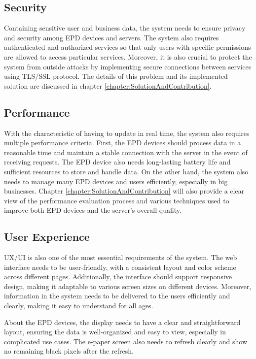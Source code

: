 \documentclass[../Main.tex]{subfiles}
\begin{document}
\subsection{Security}
Containing sensitive user and business data, the system needs to ensure privacy and security among \gls{EPD} devices and servers. The system also requires authenticated and authorized services so that only users with specific permissions are allowed to access particular services. Moreover, it is also crucial to protect the system from outside attacks by implementing secure connections between services using TLS/SSL protocol. The details of this problem and its implemented solution are discussed in chapter \ref{chapter:SolutionAndContribution}.

\subsection{Performance}
With the characteristic of having to update in real time, the system also requires multiple performance criteria. First, the \gls{EPD} devices should process data in a reasonable time and maintain a stable connection with the server in the event of receiving requests. The \gls{EPD} device also needs long-lasting battery life and sufficient resources to store and handle data. On the other hand, the system also needs to manage many \gls{EPD} devices and users efficiently, especially in big businesses. Chapter \ref{chapter:SolutionAndContribution} will also provide a clear view of the performance evaluation process and various techniques used to improve both \gls{EPD} devices and the server's overall quality.

\subsection{User Experience}
UX/UI is also one of the most essential requirements of the system. The web interface needs to be user-friendly, with a consistent layout and color scheme across different pages. Additionally, the interface should support responsive design, making it adaptable to various screen sizes on different devices. Moreover, information in the system needs to be delivered to the users efficiently and clearly, making it easy to understand for all ages.

About the \gls{EPD} devices, the display needs to have a clear and straightforward layout, ensuring the data is well-organized and easy to view, especially in complicated use cases. The e-paper screen also needs to refresh clearly and show no remaining black pixels after the refresh.
\end{document}
